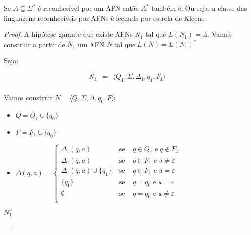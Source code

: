 \begin{lemma}
  Se $A \subseteq \Sigma^*$ é reconhecível por um AFN então $A^*$ também é.
  Ou seja, a classe das linguagens reconhecíveis por AFNs é fechada por estrela de Kleene.
\end{lemma}
\begin{proof}
  A hipótese garante que existe AFNs $N_1$ tal que $L(N_1) = A$.
  Vamos construir a partir de $N_1$ um AFN $N$ tal que $L(N) = L(N_1)^*$

  Seja:

  \begin{eqnarray*}
    N_1 & = & \langle Q_1, \Sigma, \Delta_1, q_1, F_1 \rangle\\
  \end{eqnarray*}

  Vamos construir $N = \langle Q, \Sigma, \Delta, q_0, F \rangle$:

  \begin{itemize}
  \item[] $Q = Q_1 \cup \{q_0\}$
  \item[] $F = F_1 \cup \{q_0\}$
  \item[] $\Delta(q,a) = \left\{
    \begin{array}{ccc}
      \Delta_1(q, a) & \textrm{ se } & q \in Q_1 \textrm{ e } q \notin F_1\\
      \Delta_1(q, a) & \textrm{ se } & q \in F_1 \textrm{ e } a \neq \varepsilon\\
      \Delta_1(q, a) \cup \{q_1\} & \textrm{ se } & q \in F_1 \textrm{ e } a = \varepsilon\\
      \{q_1\} & \textrm{ se } & q = q_0 \textrm{ e } a = \varepsilon\\
      \emptyset & \textrm{ se } & q = q_0 \textrm{ e } a \neq \varepsilon\\
     \end{array}\right.$
  \end{itemize}

   $N_1$
 \begin{center}
  \end{center}


\end{proof}
